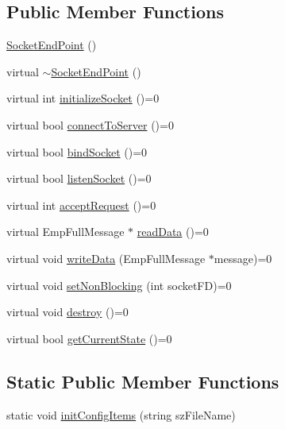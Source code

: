 \subsection*{Public Member Functions}
\begin{DoxyCompactItemize}
\item 
\hyperlink{classipc_1_1SocketEndPoint_a24700cf1faa9804dd9959ce1f25bd1b4}{Socket\+End\+Point} ()
\item 
virtual \hyperlink{classipc_1_1SocketEndPoint_a9c99d24a44f871ce8a69b5220e381855}{$\sim$\+Socket\+End\+Point} ()
\item 
virtual int \hyperlink{classipc_1_1SocketEndPoint_a84ded69d1b4d517aaefceeee03fe0846}{initialize\+Socket} ()=0
\item 
virtual bool \hyperlink{classipc_1_1SocketEndPoint_a81b916a8e92b383afa9d0bb85a76e364}{connect\+To\+Server} ()=0
\item 
virtual bool \hyperlink{classipc_1_1SocketEndPoint_a6de9aa716acefb344ddc566df4c1628d}{bind\+Socket} ()=0
\item 
virtual bool \hyperlink{classipc_1_1SocketEndPoint_a4e1ada6c59c1fc4b8d2a75e5939f06e5}{listen\+Socket} ()=0
\item 
virtual int \hyperlink{classipc_1_1SocketEndPoint_ab025dab15878d325d0932f0b813e31f4}{accept\+Request} ()=0
\item 
virtual Emp\+Full\+Message $\ast$ \hyperlink{classipc_1_1SocketEndPoint_ac626b7166cdda6bc1434d897c335e6b8}{read\+Data} ()=0
\item 
virtual void \hyperlink{classipc_1_1SocketEndPoint_ad487a279c5f3456e241a71f4b37173a1}{write\+Data} (Emp\+Full\+Message $\ast$message)=0
\item 
virtual void \hyperlink{classipc_1_1SocketEndPoint_adacb2194fa63c2eff027c094b4958997}{set\+Non\+Blocking} (int socket\+FD)=0
\item 
virtual void \hyperlink{classipc_1_1SocketEndPoint_a65dba66f56f769ae7b424cb40dd2cf5b}{destroy} ()=0
\item 
virtual bool \hyperlink{classipc_1_1SocketEndPoint_a3c86a15ac04aa3fe9480b4f6c7b09ae3}{get\+Current\+State} ()=0
\end{DoxyCompactItemize}
\subsection*{Static Public Member Functions}
\begin{DoxyCompactItemize}
\item 
static void \hyperlink{classipc_1_1SocketEndPoint_a637ace8f8872aa88463405ac95561578}{init\+Config\+Items} (string sz\+File\+Name)
\end{DoxyCompactItemize}


